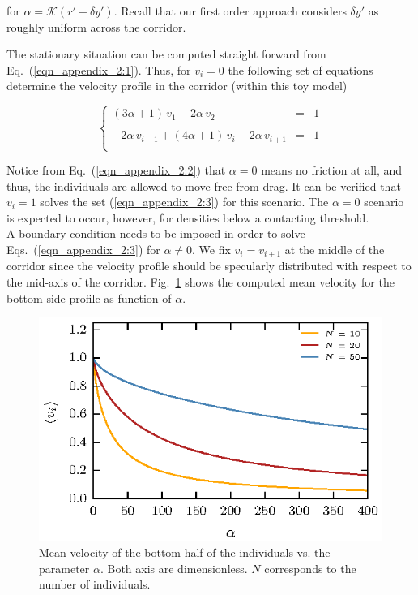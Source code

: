 \noindent for $\alpha=\mathcal{K}(r'-\delta y')$. Recall that our first order 
approach considers $\delta y'$ as roughly uniform across the corridor. 

The stationary situation can be computed straight forward from 
Eq.~(\ref{eqn_appendix_2:1}). Thus, for $\dot{v}_{i}=0$ the following set of 
equations determine the velocity profile in the corridor (within this toy 
model)

\begin{equation}
  \left\{\begin{array}{lcl}
          (3\alpha+1)\,v_{1} - 2\alpha\,v_{2} & = & 1 \\
          & & \\
          -2\alpha\,v_{i-1}+(4\alpha+1)\,v_i-2\alpha\,v_{i+1} & = & 1\\
         \end{array}\right.\label{eqn_appendix_2:3}
\end{equation}

Notice from  Eq.~(\ref{eqn_appendix_2:2}) that $\alpha=0$ means no friction at 
all, and thus, the individuals are allowed to move free from drag. It can be 
verified that $v_i=1$ solves the set (\ref{eqn_appendix_2:3}) for this 
scenario. The $\alpha=0$ scenario is expected to occur, however, for densities 
below a contacting threshold. \\

A boundary condition needs to be imposed in order to solve 
Eqs.~(\ref{eqn_appendix_2:3}) for $\alpha\neq 0$. We fix 
$v_i=v_{i+1}$ at the middle of the corridor since the velocity profile 
should be specularly distributed with respect to the mid-axis of the 
corridor. Fig.~\ref{fig:appendix_2:1} shows the computed mean velocity for the 
bottom side profile as function of $\alpha$.\\


\begin{figure}[htbp!]
\includegraphics[width=\columnwidth]
{./plots/fig_velocity_model.eps}
\caption{\label{fig:appendix_2:1} Mean velocity of the bottom half of the 
individuals vs. the parameter $\alpha$. Both axis are dimensionless. $N$ 
corresponds to the number of individuals. }
\end{figure}

